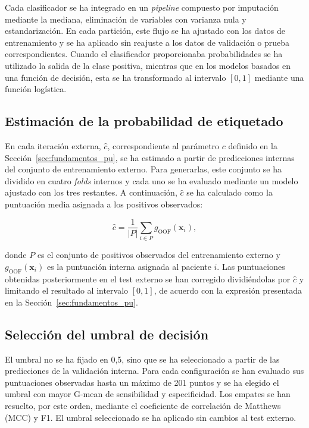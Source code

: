 Cada clasificador se ha integrado en un \textit{pipeline} compuesto por imputación mediante la mediana, eliminación de variables con varianza nula y estandarización. En cada partición, este flujo se ha ajustado con los datos de entrenamiento y se ha aplicado sin reajuste a los datos de validación o prueba correspondientes. Cuando el clasificador proporcionaba probabilidades se ha utilizado la salida de la clase positiva, mientras que en los modelos basados en una función de decisión, esta se ha transformado al intervalo \([0,1]\) mediante una función logística.

\subsection{Estimación de la probabilidad de etiquetado}
En cada iteración externa, \(\hat{c}\), correspondiente al parámetro \(c\) definido en la Sección~\ref{sec:fundamentos_pu}, se ha estimado a partir de predicciones internas del conjunto de entrenamiento externo. Para generarlas, este conjunto se ha dividido en cuatro \textit{folds} internos y cada uno se ha evaluado mediante un modelo ajustado con los tres restantes. A continuación, \(\hat{c}\) se ha calculado como la puntuación media asignada a los positivos observados:

\[
\hat{c}
=
\frac{1}{|P|}
\sum_{i\in P} g_{\mathrm{OOF}}(\mathbf{x}_i),
\]

donde \(P\) es el conjunto de positivos observados del entrenamiento externo y \(g_{\mathrm{OOF}}(\mathbf{x}_i)\) es la puntuación interna asignada al paciente \(i\). Las puntuaciones obtenidas posteriormente en el test externo se han corregido dividiéndolas por \(\hat{c}\) y limitando el resultado al intervalo \([0,1]\), de acuerdo con la expresión presentada en la Sección~\ref{sec:fundamentos_pu}.

\subsection{Selección del umbral de decisión}

El umbral no se ha fijado en 0,5, sino que se ha seleccionado a partir de las predicciones de la validación interna. Para cada configuración se han evaluado sus puntuaciones observadas hasta un máximo de 201 puntos y se ha elegido el umbral con mayor G-mean de sensibilidad y especificidad. Los empates se han resuelto, por este orden, mediante el coeficiente de correlación de Matthews (MCC) y F1. El umbral seleccionado se ha aplicado sin cambios al test externo.

